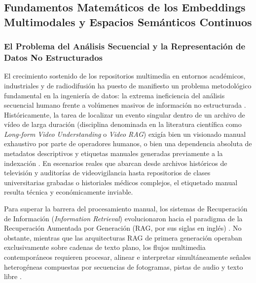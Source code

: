 
\subsection{Fundamentos Matemáticos de los Embeddings Multimodales y Espacios Semánticos Continuos}
\label{subsec:fundamentos_embeddings}

\subsubsection{El Problema del Análisis Secuencial y la Representación de Datos No Estructurados}
\label{subsubsec:problema_analisis_secuencial}

El crecimiento sostenido de los repositorios multimedia en entornos académicos, industriales y de radiodifusión ha puesto de manifiesto un problema metodológico fundamental en la ingeniería de datos: la extrema ineficiencia del análisis secuencial humano frente a volúmenes masivos de información no estructurada \cite{prajwal2025multimodal}. Históricamente, la tarea de localizar un evento singular dentro de un archivo de vídeo de larga duración (disciplina denominada en la literatura científica como \textit{Long-form Video Understanding} o \textit{Video RAG}) exigía bien un visionado manual exhaustivo por parte de operadores humanos, o bien una dependencia absoluta de metadatos descriptivos y etiquetas manuales generadas previamente a la indexación \cite{multi_rag2025}. En escenarios reales que abarcan desde archivos históricos de televisión y auditorías de videovigilancia hasta repositorios de clases universitarias grabadas o historiales médicos complejos, el etiquetado manual resulta técnica y económicamente inviable.

Para superar la barrera del procesamiento manual, los sistemas de Recuperación de Información (\textit{Information Retrieval}) evolucionaron hacia el paradigma de la Recuperación Aumentada por Generación (RAG, por sus siglas en inglés) \cite{prajwal2025multimodal}. No obstante, mientras que las arquitecturas RAG de primera generación operaban exclusivamente sobre cadenas de texto plano, los flujos multimedia contemporáneos requieren procesar, alinear e interpretar simultáneamente señales heterogéneas compuestas por secuencias de fotogramas, pistas de audio y texto libre \cite{prajwal2025multimodal, multi_rag2025}.

